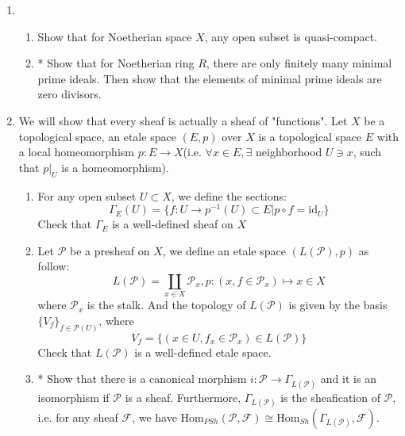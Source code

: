 \documentclass[a4paper,11pt]{article}
\def\mrm#1{\mathrm{#1}}
\def\Hom{\mathrm{Hom}}
\begin{document}
\begin{enumerate}[1.]
\item \begin{enumerate}
    \item Show that for Noetherian space $X$, any open subset is quasi-compact.
    \item* Show that for Noetherian ring $R$, there are only finitely many minimal prime ideals. Then show that the elements of minimal prime ideals are zero divisors.
\end{enumerate}
\item We will show that every sheaf is actually a sheaf of "functions". Let $X$ be a topological space, an etale space $(E,p)$ over $X$ is a topological space $E$ with a local homeomorphism $p:E\to X$(i.e. $\forall x\in E, \exists$ neighborhood $U\ni x$, such that $p|_U$ is a homeomorphism).
\begin{enumerate}
    \item For any open subset $U \subset X$, we define the sections:
    \[ \Gamma_E(U) = \{f:U\to p^{-1}(U)\subset E| p\circ f=\mrm{id}_U\}
        \]
    Check that $\Gamma_E$ is a well-defined sheaf on $X$
    \item Let $\mathcal{P}$ be a presheaf on $X$, we define an etale space $(L(\mathcal{P}),p)$ as follow:
    \[L(\mathcal{P})=\coprod _{x\in X} \mathcal{P}_x , p:(x, f\in \mathcal{P}_x) \mapsto x\in X\]
    where $\mathcal{P}_x$ is the stalk. And the topology of $L(\mathcal{P}) $ is given by the basis $\{V_f\}_{f\in \mathcal{P}(U) }$, where 
    \[ V_f=\{(x\in U, f_x \in \mathcal{P}_x)\in L(\mathcal{P})\}\]
    Check that $L(\mathcal{P})$ is a well-defined etale space.
    \item* Show that there is a canonical morphism $i:\mathcal{P}\to \Gamma_{L(\mathcal{P})}$ and it is an isomorphism if $\mathcal{P}$ is a sheaf. Furthermore, $\Gamma_{L(\mathcal{P})}$ is the sheafication of $\mathcal{P}$, i.e. for any sheaf $\mathcal{F}$, we have $\Hom_{PSh}(\mathcal{P},\mathcal{F})\cong \Hom_{Sh}(\Gamma_{L(\mathcal{P})},\mathcal{F})$.
\end{enumerate}




\end{enumerate}
\end{document}
